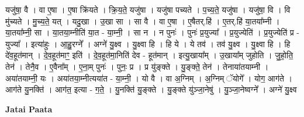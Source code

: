 \documentclass[17pt]{extarticle}
\begin{document}
यजु॑षा॒ वै । वा ए॒षा । ए॒षा क्रि॑यते । क्रि॒य॒ते॒ यजु॑षा । यजु॑षा पच्यते । प॒च्य॒ते॒ यजु॑षा । यजु॑षा॒ वि । वि मु॑च्यते । मु॒च्य॒ते॒ यत् । यदु॒खा । उ॒खा सा । सा वै । वा ए॒षा । ए॒षैतर्.हि॑ । ए॒तर्.हि॑ या॒तया᳚म्नी । या॒तया᳚म्नी॒ सा । या॒तया॒म्नीति॑ या॒त - या॒म्नी॒ । सा न । न पुनः॑ । पुनः॑ प्र॒युज्या᳚ । प्र॒युज्येति॑ । प्र॒युज्येति॑ प्र - युज्या᳚ । इत्या॑हुः । आ॒हु॒रग्ने᳚ । अग्ने॑ यु॒क्ष्व । यु॒क्ष्वा हि । हि ये । ये तव॑ । तव॑ यु॒क्ष्व । यु॒क्ष्वा हि । हि दे॑व॒हूत॑मान् । दे॒व॒हूत॑माꣳ॒॒ इति॑ । दे॒व॒हूत॑मा॒निति॑ देव - हूत॑मान् । इत्यु॒खाया᳚म् । उ॒खाया᳚म् जुहोति । जु॒हो॒ति॒ तेन॑ । तेनै॒व । ए॒वैना᳚म् । ए॒ना॒म् पुनः॑ । पुनः॒ प्र । प्र यु॑ङ्क्ते । यु॒ङ्क्ते॒ तेन॑ । तेनाया॑तयाम्नी । अया॑तयाम्नी॒ यः । अया॑तया॒म्नीत्यया॑त - या॒म्नी॒ । यो वै । वा अ॒ग्निम् । अ॒ग्निम् ॅयोगे᳚ । योग॒ आग॑ते । आग॑ते यु॒नक्ति॑ । आग॑त॒ इत्या - ग॒ते॒ । यु॒नक्ति॑ यु॒ङ्क्ते । यु॒ङ्क्ते यु॑ञ्जा॒नेषु॑ । यु॒ञ्जा॒नेष्वग्ने᳚ । अग्ने॑ यु॒क्ष्व \newline

\textbf{Jatai Paata} \newline
\end{document}
